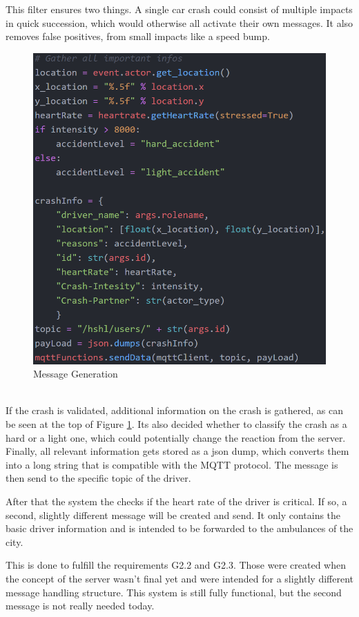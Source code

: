 \noindent
This filter ensures two things.
A single car crash could consist of multiple impacts in quick succession,
which would otherwise all activate their own messages.
It also removes false positives, from small impacts
like a speed bump.
\begin{figure}
    \vspace{-6pt}
  \includegraphics[width=\linewidth]{chapters/chapter6_bruno/Figures/collisionCode2.png}
    \vspace{-10pt}
  \caption{Message Generation}
  \label{6fig:onCollCode2}
  \vspace{-20pt}
\end{figure}
\\
\noindent
If the crash is validated, additional information on the crash is gathered,
as can be seen at the top of Figure \ref{6fig:onCollCode2}.
Its also decided whether to classify the crash as a hard or a light one,
which could potentially change the reaction from the server.
\\
\newline
Finally, all relevant information gets stored as a json dump,
which converts them into a long string that is compatible with the MQTT protocol.
The message is then send to the specific topic of the driver.\linebreak

\noindent
After that the system the checks if the heart rate of the driver is critical.
If so, a second, slightly different message will be created and send.
It only contains the basic driver information and
is intended to be forwarded to the ambulances of the city.

\noindent
This is done to fulfill the requirements G2.2 and G2.3.
Those were created when the concept of the server wasn't final yet
and were intended for a slightly different message handling structure.
This system is still fully functional,
but the second message is not really needed today.
